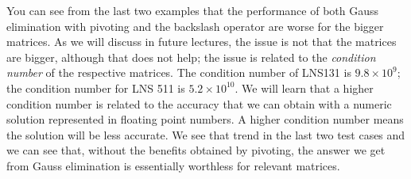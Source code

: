 You can see from the last two examples that the performance of both Gauss elimination with pivoting and the backslash operator are worse for the bigger matrices.  As we will discuss in future lectures, the issue is not that the matrices are bigger, although that does not help; the issue is related to the \emph{condition number} of the respective matrices.  The condition number of LNS131 is $9.8\times 10^9$; the condition number for LNS 511 is $5.2 \times 10^{10}$.  We will learn that a higher condition number is related to the accuracy that we can obtain with a numeric solution represented in floating point numbers.  A higher condition number means the solution will be less accurate.  We see that trend in the last two test cases and we can see that, without the benefits obtained by pivoting, the answer we get from Gauss elimination is essentially worthless for relevant matrices.


